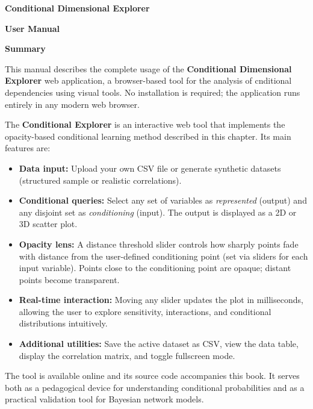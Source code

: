 \documentclass[12pt]{article}
\begin{document}
\begin{titlepage}
  \begin{center}
  \vspace*{2cm}
  {\fontsize{28}{34}\selectfont\bfseries\color{accentgold}
    Conditional Dimensional Explorer}
  \vspace{1cm}
  {\LARGE\bfseries User Manual\par}

  \vspace{3mm}
  
    {\LARGE\bfseries Summary\par}
    \vspace{5mm}
    \end{center}

    This manual describes the complete usage of the \textbf{Conditional Dimensional Explorer} web application, a browser-based tool for the analysis of cnditional dependencies using visual tools. No installation is required; the application runs entirely in any modern web browser.

    The \textbf{Conditional Explorer} is an interactive web tool that implements the opacity-based conditional learning method described in this chapter. Its main features are:

\begin{itemize}
    \item \textbf{Data input:} Upload your own CSV file or generate synthetic datasets (structured sample or realistic correlations).
    \item \textbf{Conditional queries:} Select any set of variables as \emph{represented} (output) and any disjoint set as \emph{conditioning} (input). The output is displayed as a 2D or 3D scatter plot.
    \item \textbf{Opacity lens:} A distance threshold slider controls how sharply points fade with distance from the user-defined conditioning point (set via sliders for each input variable). Points close to the conditioning point are opaque; distant points become transparent.
    \item \textbf{Real-time interaction:} Moving any slider updates the plot in milliseconds, allowing the user to explore sensitivity, interactions, and conditional distributions intuitively.
    \item \textbf{Additional utilities:} Save the active dataset as CSV, view the data table, display the correlation matrix, and toggle fullscreen mode.
\end{itemize}

The tool is available online and its source code accompanies this book. It serves both as a pedagogical device for understanding conditional probabilities and as a practical validation tool for Bayesian network models.
  \vfill

\end{titlepage}
\end{document}
